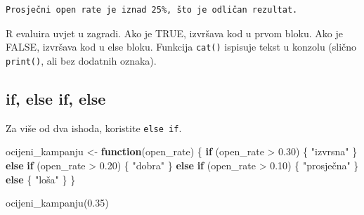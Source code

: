 \documentclass[
  croatian,
  letterpaper,
  DIV=11,
  numbers=noendperiod]{scrartcl}
\newenvironment{Shaded}{\begin{snugshade}}{\end{snugshade}}
\newcommand{\ControlFlowTok}[1]{\textcolor[rgb]{0.00,0.23,0.31}{\textbf{#1}}}
\newcommand{\FloatTok}[1]{\textcolor[rgb]{0.68,0.00,0.00}{#1}}
\newcommand{\FunctionTok}[1]{\textcolor[rgb]{0.28,0.35,0.67}{#1}}
\newcommand{\NormalTok}[1]{\textcolor[rgb]{0.00,0.23,0.31}{#1}}
\newcommand{\OtherTok}[1]{\textcolor[rgb]{0.00,0.23,0.31}{#1}}
\newcommand{\SpecialCharTok}[1]{\textcolor[rgb]{0.37,0.37,0.37}{#1}}
\newcommand{\StringTok}[1]{\textcolor[rgb]{0.13,0.47,0.30}{#1}}
\begin{document}
\begin{Shaded}
\end{Shaded}

\begin{verbatim}
Prosječni open rate je iznad 25%, što je odličan rezultat.
\end{verbatim}

R evaluira uvjet u zagradi. Ako je TRUE, izvršava kod u prvom bloku. Ako
je FALSE, izvršava kod u else bloku. Funkcija \texttt{cat()} ispisuje
tekst u konzolu (slično \texttt{print()}, ali bez dodatnih oznaka).

\subsection{if, else if, else}\label{if-else-if-else}

Za više od dva ishoda, koristite \texttt{else\ if}.

\begin{Shaded}
\begin{Highlighting}[]
\NormalTok{ocijeni\_kampanju }\OtherTok{\textless{}{-}} \ControlFlowTok{function}\NormalTok{(open\_rate) \{}
  \ControlFlowTok{if}\NormalTok{ (open\_rate }\SpecialCharTok{\textgreater{}} \FloatTok{0.30}\NormalTok{) \{}
    \StringTok{"izvrsna"}
\NormalTok{  \} }\ControlFlowTok{else} \ControlFlowTok{if}\NormalTok{ (open\_rate }\SpecialCharTok{\textgreater{}} \FloatTok{0.20}\NormalTok{) \{}
    \StringTok{"dobra"}
\NormalTok{  \} }\ControlFlowTok{else} \ControlFlowTok{if}\NormalTok{ (open\_rate }\SpecialCharTok{\textgreater{}} \FloatTok{0.10}\NormalTok{) \{}
    \StringTok{"prosječna"}
\NormalTok{  \} }\ControlFlowTok{else}\NormalTok{ \{}
    \StringTok{"loša"}
\NormalTok{  \}}
\NormalTok{\}}

\FunctionTok{ocijeni\_kampanju}\NormalTok{(}\FloatTok{0.35}\NormalTok{)}
\end{Highlighting}
\end{Shaded}
\end{document}
